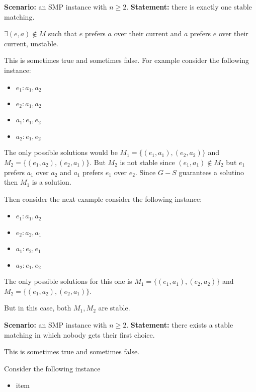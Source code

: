 \begin{questions}
	\question[3] \textbf{Scenario:} an SMP instance with $n \ge 2$. \textbf{Statement:} there is exactly one stable matching.
	\ifsolutions\fi

	\(\exists (e, a) \notin M\) such that \(e\) prefers \(a\) over their current and \(a\) prefers \(e\) over their current, unstable.

	\begin{soln}
		This is sometimes true and sometimes false.
		For example consider the following instance:
		\begin{itemize}
			\item	\(e_1 : a_1, a_2\)
			\item \(e_2 : a_1, a_2\)
			\item \(a_1 : e_1, e_2\)
			\item \(a_2 : e_1, e_2\)
		\end{itemize}
		The only possible solutions would be \(M_1 = \{(e_1, a_1), (e_2, a_2)\}\) and \(M_2 = \{(e_1, a_2), (e_2, a_1)\}\).
		But \(M_2\) is not stable since \((e_1, a_1) \notin M_2\) but \(e_1\) prefers \(a_1\) over \(a_2\) and \(a_1\) prefers \(e_1\) over \(e_2\).
		Since \(G-S\) guarantees a solutino then \(M_1\) is a solution.

		Then consider the next example consider the following instance:
		\begin{itemize}
			\item	\(e_1 : a_1, a_2\)
			\item \(e_2 : a_2, a_1\)
			\item \(a_1 : e_2, e_1\)
			\item \(a_2 : e_1, e_2\)
		\end{itemize}
		The only possible solutions for this one is \(M_1 = \{(e_1, a_1), (e_2, a_2)\}\) and \(M_2 = \{(e_1, a_2), (e_2, a_1)\}\).

		But in this case, both \(M_1, M_2\) are stable.
	\end{soln}


	\question[4] \textbf{Scenario:} an SMP instance with $n \ge 2$. \textbf{Statement:} there exists a stable matching in which nobody gets their first choice.

	\begin{soln}
		This is sometimes true and sometimes false.

		Consider the following instance
		\begin{itemize}
			\item item
		\end{itemize}



\end{soln}
\end{questions}
